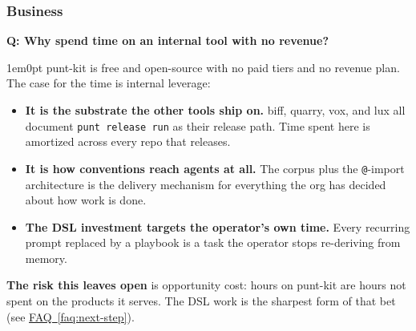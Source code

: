 \documentclass[11pt,letterpaper]{article}
\newcounter{faqnum}
\newenvironment{faqpair}[1]{%
  \needspace{4\baselineskip}%
  \vspace{0.5em}%
  \refstepcounter{faqnum}%
  \noindent\textbf{\color{SectionBlue}Q\thefaqnum: #1}\par\nopagebreak[4]%
  \vspace{0.2em}%
  \begin{adjustwidth}{1em}{0pt}%
  \setlength{\parindent}{0pt}%
}{%
  \end{adjustwidth}%
  \vspace{0.5em}%
}
\newcommand{\faqref}[1]{\hyperref[#1]{FAQ~\ref*{#1}}}
\begin{document}
\subsubsection*{Business}

\begin{faqpair}{Why spend time on an internal tool with no revenue?}\label{faq:revenue-model}
  punt-kit is free and open-source with no paid tiers and no revenue plan. The
  case for the time is internal leverage:
  \begin{itemize}[nosep]
    \item \textbf{It is the substrate the other tools ship on.} biff, quarry,
      vox, and lux all document \texttt{punt release run} as their release path.
      Time spent here is amortized across every repo that releases.
    \item \textbf{It is how conventions reach agents at all.} The corpus plus
      the \texttt{@}-import architecture is the delivery mechanism for
      everything the org has decided about how work is done.
    \item \textbf{The DSL investment targets the operator's own time.} Every
      recurring prompt replaced by a playbook is a task the operator stops
      re-deriving from memory.
  \end{itemize}
  \textbf{The risk this leaves open} is opportunity cost: hours on punt-kit are
  hours not spent on the products it serves. The DSL work is the sharpest form
  of that bet (see \faqref{faq:next-step}).
\end{faqpair}
\end{document}
